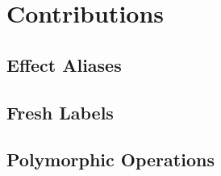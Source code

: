 \documentclass{amsart}
\begin{document}
\section{Contributions}

\subsection{Effect Aliases}

\subsection{Fresh Labels}

\subsection{Polymorphic Operations}




\appendix




\end{document}

